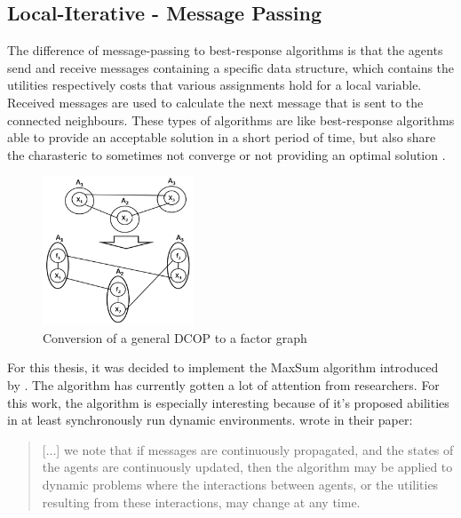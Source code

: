 \subsection{Local-Iterative - Message Passing}
The difference of message-passing to best-response algorithms is that the agents send and receive messages containing a specific data structure, which contains the utilities respectively costs that various assignments hold for a local variable. Received messages are used to calculate the next message that is sent to the connected neighbours. These types of algorithms are like best-response algorithms able to provide an acceptable solution in a short period of time, but also share the charasteric to sometimes not converge or not providing an optimal solution \cite{Chapman2011}.
\begin{figure}[H]
\centering
\includegraphics[width=170px]{graphics/factorgraph}
\caption{Conversion of a general DCOP to a factor graph\cite{Zivan2012}}
\label{fig:factorgraph}
\end{figure}

For this thesis, it was decided to implement the MaxSum algorithm introduced by \cite{Farinelli2008}. The algorithm has currently gotten a lot of attention from researchers. For this work, the algorithm is especially interesting because of it's proposed abilities in at least synchronously run dynamic environments.  \cite{Farinelli2008} wrote in their paper:
\begin{quote}
[...] we note that if messages are continuously propagated,
and the states of the agents are continuously updated, then the algorithm may be applied to dynamic problems where the interactions between agents, or the utilities resulting from these interactions, may change at any time.
\end{quote}

